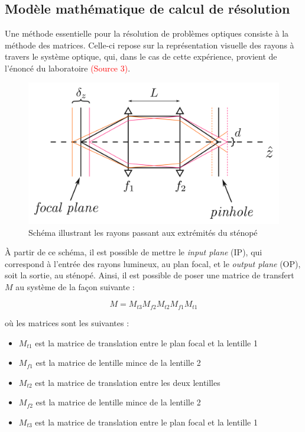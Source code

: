 \documentclass[11pt,letterpaper]{article}
\begin{document}

\subsection{Modèle mathématique de calcul de résolution}
Une méthode essentielle pour la résolution de problèmes optiques consiste à la méthode des matrices. Celle-ci repose sur la représentation visuelle des rayons à travers le système optique, qui, dans le cas de cette expérience, provient de l'énoncé du laboratoire \textcolor{red}{(Source 3)}.
\begin{figure}[H]
  \centering
  \includegraphics[scale=0.15]{rayons_pinhole.png}
  \caption{Schéma illustrant les rayons passant aux extrémités du sténopé}
  \label{rayons}
\end{figure}

À partir de ce schéma, il est possible de mettre le \textit{input plane} (IP), qui correspond à l'entrée des rayons lumineux, au plan focal, et le \textit{output plane} (OP), soit la sortie, au sténopé. Ainsi, il est possible de poser une matrice de transfert $M$ au système de la façon suivante :

\begin{equation}
  M = M_{t3}M_{f2}M_{t2}M_{f1}M_{t1}
\end{equation}

où les matrices sont les suivantes :

\begin{itemize}
\item $M_{t1}$ est la matrice de translation entre le plan focal et la lentille 1
\item $M_{f1}$ est la matrice de lentille mince de la lentille 2
\item $M_{t2}$ est la matrice de translation entre les deux lentilles
\item $M_{f2}$ est la matrice de lentille mince de la lentille 2
\item $M_{t3}$ est la matrice de translation entre le plan focal et la lentille 1
\end{itemize}
\end{document}
